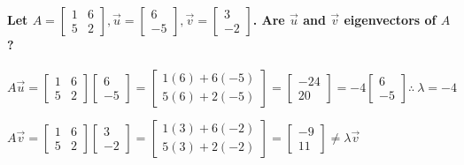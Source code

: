 \documentclass[
  letterpaper,
  DIV=11,
  numbers=noendperiod]{scrartcl}
\let\oldparagraph\paragraph
\renewcommand{\paragraph}[1]{\oldparagraph{#1}\mbox{}}
\begin{document}
\paragraph{\texorpdfstring{Let
\(A = \begin{bmatrix} 1 & 6 \\ 5 & 2\end{bmatrix}, \vec{u} = \begin{bmatrix} 6 \\ -5\end{bmatrix}, \vec{v} = \begin{bmatrix}3 \\ -2 \end{bmatrix}\).
Are \(\vec{u}\) and \(\vec{v}\) eigenvectors of
\(A\)?}{Let A = \textbackslash begin\{bmatrix\} 1 \& 6 \textbackslash\textbackslash{} 5 \& 2\textbackslash end\{bmatrix\}, \textbackslash vec\{u\} = \textbackslash begin\{bmatrix\} 6 \textbackslash\textbackslash{} -5\textbackslash end\{bmatrix\}, \textbackslash vec\{v\} = \textbackslash begin\{bmatrix\}3 \textbackslash\textbackslash{} -2 \textbackslash end\{bmatrix\}. Are \textbackslash vec\{u\} and \textbackslash vec\{v\} eigenvectors of A?}}\label{let-a-beginbmatrix-1-6-5-2endbmatrix-vecu-beginbmatrix-6--5endbmatrix-vecv-beginbmatrix3--2-endbmatrix.-are-vecu-and-vecv-eigenvectors-of-a}

\(A\vec{u} = \begin{bmatrix} 1 & 6 \\ 5 & 2\end{bmatrix}\begin{bmatrix} 6 \\ -5\end{bmatrix} = \begin{bmatrix} 1(6)+6(-5) \\ 5(6)+2(-5)\end{bmatrix} = \begin{bmatrix} -24 \\ 20\end{bmatrix} = -4\begin{bmatrix}6 \\ -5\end{bmatrix} \therefore \ \lambda = -4\)

\(A\vec{v} = \begin{bmatrix} 1 & 6 \\ 5 & 2\end{bmatrix}\begin{bmatrix} 3 \\ -2\end{bmatrix} = \begin{bmatrix} 1(3)+6(-2) \\ 5(3)+2(-2)\end{bmatrix} = \begin{bmatrix} -9 \\ 11\end{bmatrix} \neq \lambda\vec{v}\)
\end{document}
